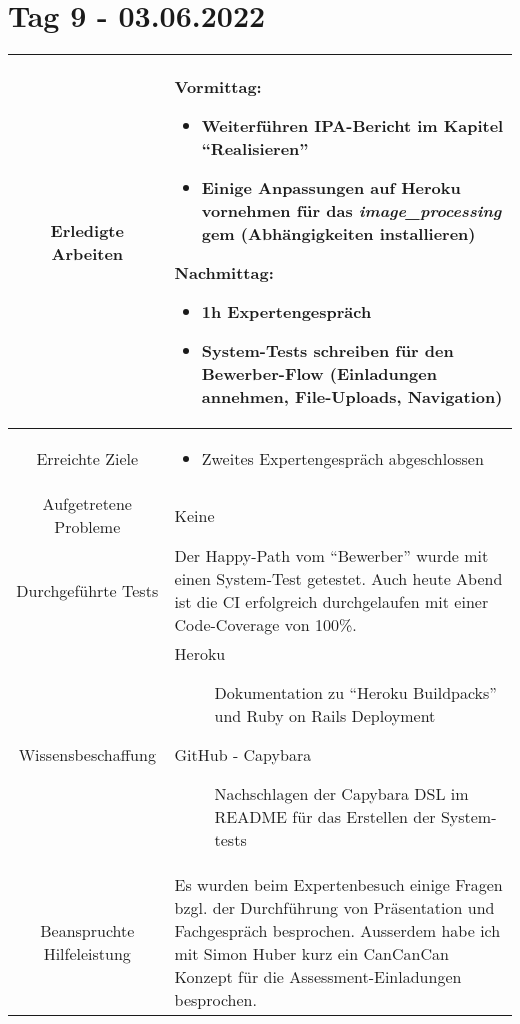 \section{Tag 9 - 03.06.2022}

\begin{tabularx}{\textwidth}[H]{|c|X|}
    \hline
    Erledigte Arbeiten         &
    \textbf{Vormittag:}
    \begin{itemize}
        \item Weiterführen IPA-Bericht im Kapitel \enquote{Realisieren}
        \item Einige Anpassungen auf Heroku vornehmen für das \emph{image\_processing} gem (Abhängigkeiten installieren)
    \end{itemize}
    \textbf{Nachmittag:}
    \begin{itemize}
        \item 1h Expertengespräch
        \item System-Tests schreiben für den Bewerber-Flow (Einladungen annehmen, File-Uploads, Navigation)
    \end{itemize}
    \\ \hline

    Erreichte Ziele            &
    \begin{itemize}
        \item Zweites Expertengespräch abgeschlossen
    \end{itemize}
    \\ \hline

    Aufgetretene Probleme      &
    Keine
    \\ \hline

    Durchgeführte Tests        &
    Der Happy-Path vom \enquote{Bewerber} wurde mit einen System-Test getestet.
    Auch heute Abend ist die CI erfolgreich durchgelaufen mit einer Code-Coverage von 100\%.
    \\ \hline

    Wissensbeschaffung         &
    \begin{description}
        \item[Heroku] Dokumentation zu \enquote{Heroku Buildpacks} und Ruby on Rails Deployment
        \item[GitHub - Capybara] Nachschlagen der Capybara DSL im README für das Erstellen der System-tests
    \end{description}
    \\ \hline

    Beanspruchte Hilfeleistung &
    Es wurden beim Expertenbesuch einige Fragen bzgl. der Durchführung von Präsentation und Fachgespräch besprochen.
    Ausserdem habe ich mit Simon Huber kurz ein CanCanCan Konzept für die Assessment-Einladungen besprochen.
    \\ \hline


\end{tabularx}
